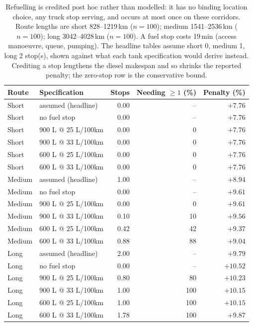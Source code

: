 \begin{table}[ht]\centering
\caption{Refuelling is credited post hoc rather than modelled: it has no binding location choice, any truck stop serving, and occurs at most once on these corridors.  Route lengths are short 828--1219\,km ($n=100$); medium 1541--2536\,km ($n=100$); long 3042--4028\,km ($n=100$).  A fuel stop costs 19\,min (access manoeuvre, queue, pumping).  The headline tables assume short 0, medium 1, long 2 stop(s), shown against what each tank specification would derive instead.  Crediting a stop lengthens the diesel makespan and so shrinks the reported penalty; the zero-stop row is the conservative bound.}
\label{tab:diesel-refuel}
\begin{tabular}{llrrr}
\hline
Route & Specification & Stops & Needing $\geq 1$ (\%) & Penalty (\%) \\
\hline
Short & assumed (headline) & 0.00 & -- & $+7.76$ \\
Short & no fuel stop & 0.00 & -- & $+7.76$ \\
Short & 900 L @ 25 L/100km & 0.00 & 0 & $+7.76$ \\
Short & 900 L @ 33 L/100km & 0.00 & 0 & $+7.76$ \\
Short & 600 L @ 25 L/100km & 0.00 & 0 & $+7.76$ \\
Short & 600 L @ 33 L/100km & 0.00 & 0 & $+7.76$ \\
Medium & assumed (headline) & 1.00 & -- & $+8.94$ \\
Medium & no fuel stop & 0.00 & -- & $+9.61$ \\
Medium & 900 L @ 25 L/100km & 0.00 & 0 & $+9.61$ \\
Medium & 900 L @ 33 L/100km & 0.10 & 10 & $+9.56$ \\
Medium & 600 L @ 25 L/100km & 0.42 & 42 & $+9.37$ \\
Medium & 600 L @ 33 L/100km & 0.88 & 88 & $+9.04$ \\
Long & assumed (headline) & 2.00 & -- & $+9.79$ \\
Long & no fuel stop & 0.00 & -- & $+10.52$ \\
Long & 900 L @ 25 L/100km & 0.80 & 80 & $+10.23$ \\
Long & 900 L @ 33 L/100km & 1.00 & 100 & $+10.15$ \\
Long & 600 L @ 25 L/100km & 1.00 & 100 & $+10.15$ \\
Long & 600 L @ 33 L/100km & 1.78 & 100 & $+9.87$ \\
\hline
\end{tabular}
\end{table}
